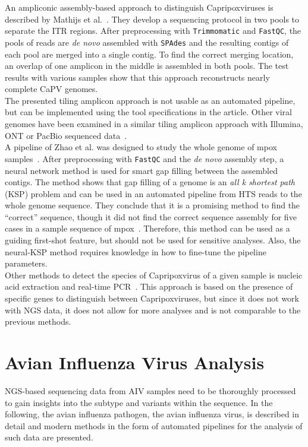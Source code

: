 An ampliconic assembly-based approach to distinguish Capripoxviruses is described by Mathijs et al.~\cite{mathijs2022robust}. They develop a sequencing protocol in two pools to separate the \ac{ITR} regions. After preprocessing with \texttt{Trimmomatic} and \texttt{FastQC}, the pools of reads are \textit{de novo} assembled with \texttt{SPAdes} and the resulting contigs of each pool are merged into a single contig. To find the correct merging location, an overlap of one amplicon in the middle is assembled in both pools. The test results with various samples show that this approach reconstructs nearly complete \acs{CaPV} genomes. \\
The presented tiling amplicon approach is not usable as an automated pipeline, but can be implemented using the tool specifications in the article. Other viral genomes have been examined in a similar tiling amplicon approach with Illumina, \ac{ONT} or PacBio sequenced data~\cite{quick2017multiplex, grubaugh2019amplicon, freed2020rapid, gardner2014multiplex}. \\
A pipeline of Zhao et al. was designed to study the whole genome of mpox samples~\cite{zhao2016finishing}. After preprocessing with \texttt{FastQC} and the \textit{de novo} assembly step, a neural network method is used for smart gap filling between the assembled contigs. The method shows that gap filling of a genome is an \textit{all k shortest path} (KSP) problem and can be used in an automated pipeline from \ac{HTS} reads to the whole genome sequence. They conclude that it is a promising method to find the ``correct'' sequence, though it did not find the correct sequence assembly for five cases in a sample sequence of mpox~\cite{zhao2016finishing}. Therefore, this method can be used as a guiding first-shot feature, but should not be used for sensitive analyses. Also, the neural-\acs{KSP} method requires knowledge in how to fine-tune the pipeline parameters. \\
Other methods to detect the species of Capripoxvirus of a given sample is nucleic acid extraction and real-time \ac{PCR}~\cite{armson2017detection}. This approach is based on the presence of specific genes to distinguish between Capripoxviruses, but since it does not work with \ac{NGS} data, it does not allow for more analyses and is not comparable to the previous methods.

\section{Avian Influenza Virus Analysis}\label{sec:AIV}
\ac{NGS}-based sequencing data from \ac{AIV} samples need to be thoroughly processed to gain insights into the subtype and variants within the sequence. In the following, the avian influenza pathogen, the avian influenza virus, is described in detail and modern methods in the form of automated pipelines for the analysis of such data are presented.

